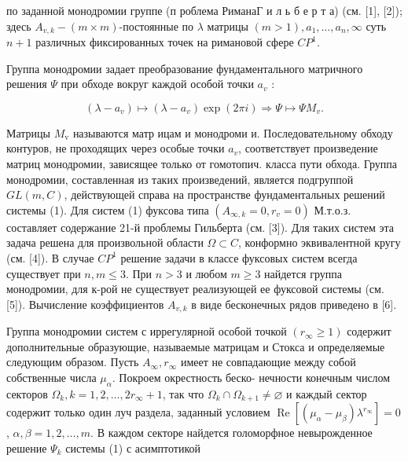 \documentclass[10pt]{article}
\begin{document}
по заданной монодромии группе (п роблема РиманаГ и л ь б е р т а) (см. [1], [2]); здесь $A_{v, k}-(m \times m)$-постоянные по $\lambda$ матрицы $(m>1), a_{1}, \ldots, a_{n}, \infty$ суть $n+1$ различных фиксированных точек на римановой сфере $C P^{1}$.



Группа монодромии задает преобразование фундаментального матричного решения $\Psi$ при обходе вокруг каждой особой точки $a_{v}$ :



\[

\left(\lambda-a_{v}\right) \mapsto\left(\lambda-a_{v}\right) \exp (2 \pi i) \Rightarrow \Psi \mapsto \Psi M_{v} .

\]



Матрицы $M_{\mathrm{v}}$ называются матр ицам и монодроми и. Последовательному обходу контуров, не проходящих через особые точки $a_{v}$, соответствует произведение матриц монодромии, зависящее только от гомотопич. класса пути обхода. Группа монодромии, составленная из таких произведений, является подгруппой $G L(m, C)$, действующей справа на пространстве фундаментальных решений системы (1). Для систем (1) фуксова типа $\left(A_{\infty, k}=0, r_{v}=0\right)$ М.т.о.з. составляет содержание 21-й проблемы Гильберта (см. [3]). Для таких систем эта задача решена для произвольной области $\Omega \subset C$, конформно эквивалентной кругу (см. [4]). В случае $C P^{1}$ решение задачи в классе фуксовых систем всегда существует при $n, m \leqslant 3$. При $n>3$ и любом $m \geqslant 3$ найдется группа монодромии, для к-рой не существует реализующей ее фуксовой системы (см. [5]). Вычисление коэффициентов $A_{v, k}$ в виде бесконечных рядов приведено в [6].



Группа монодромии систем с иррегулярной особой точкой $\left(r_{\infty} \geqslant 1\right)$ содержит дополнительные образующие, называемые матрицам и Стокса и определяемые следующим образом. Пусть $A_{\infty}, r_{\infty}$ имеет не совпадающие между собой собственные числа $\mu_{\alpha}$. Покроем окрестность беско- нечности конечным числом секторов $\Omega_{k}, k=1,2, \ldots, 2 r_{\infty}+1$, так что $\Omega_{k} \cap \Omega_{k+1} \neq \varnothing$ и каждый сектор содержит только один луч раздела, заданный условием $\operatorname{Re}\left[\left(\mu_{\alpha}-\mu_{\beta}\right) \lambda^{r_{\infty}}\right]=0$, $\alpha, \beta=1,2, \ldots, m$. В каждом секторе найдется голоморфное невырожденное решение $\Psi_{k}$ системы (1) с асимптотикой
\end{document}
